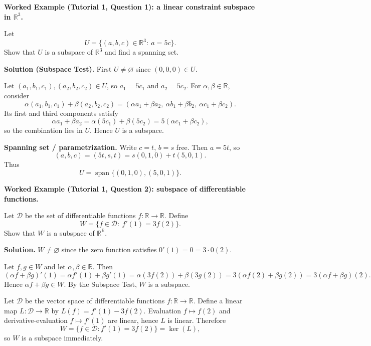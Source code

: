 \begin{examplebox}
\textbf{Worked Example (Tutorial 1, Question 1): a linear constraint subspace in $\mathbb{R}^3$.}

Let
\[
U=\{(a,b,c)\in\mathbb{R}^3:\ a=5c\}.
\]
Show that $U$ is a subspace of $\mathbb{R}^3$ and find a spanning set.

\medskip
\textbf{Solution (Subspace Test).}
First $U\neq\varnothing$ since $(0,0,0)\in U$.

Let $(a_1,b_1,c_1),(a_2,b_2,c_2)\in U$, so $a_1=5c_1$ and $a_2=5c_2$.
For $\alpha,\beta\in\mathbb{R}$, consider
\[
\alpha(a_1,b_1,c_1)+\beta(a_2,b_2,c_2)=(\alpha a_1+\beta a_2,\ \alpha b_1+\beta b_2,\ \alpha c_1+\beta c_2).
\]
Its first and third components satisfy
\[
\alpha a_1+\beta a_2=\alpha(5c_1)+\beta(5c_2)=5(\alpha c_1+\beta c_2),
\]
so the combination lies in $U$. Hence $U$ is a subspace.

\medskip
\textbf{Spanning set / parametrization.}
Write $c=t$, $b=s$ free. Then $a=5t$, so
\[
(a,b,c)=(5t,s,t)=s(0,1,0)+t(5,0,1).
\]
Thus
\[
U=\operatorname{span}\{(0,1,0),(5,0,1)\}.
\]
\end{examplebox}

\begin{examplebox}
\textbf{Worked Example (Tutorial 1, Question 2): subspace of differentiable functions.}

Let $\mathcal{D}$ be the set of differentiable functions $f:\mathbb{R}\to\mathbb{R}$.
Define
\[
W=\{f\in\mathcal{D}:\ f'(1)=3f(2)\}.
\]
Show that $W$ is a subspace of $\mathbb{R}^{\mathbb{R}}$.

\medskip
\textbf{Solution.}
$W\neq\varnothing$ since the zero function satisfies $0'(1)=0=3\cdot 0(2)$.

Let $f,g\in W$ and let $\alpha,\beta\in\mathbb{R}$.
Then
\[
(\alpha f+\beta g)'(1)=\alpha f'(1)+\beta g'(1)=\alpha(3f(2))+\beta(3g(2))=3(\alpha f(2)+\beta g(2))=3(\alpha f+\beta g)(2).
\]
Hence $\alpha f+\beta g\in W$. By the Subspace Test, $W$ is a subspace.
\end{examplebox}

\begin{policynote}[title={Extension (Tutorial 1, Question 2, Method 2)}]
Let $\mathcal{D}$ be the vector space of differentiable functions $f:\mathbb{R}\to\mathbb{R}$.
Define a linear map $L:\mathcal{D}\to\mathbb{R}$ by $L(f)=f'(1)-3f(2)$.
Evaluation $f\mapsto f(2)$ and derivative-evaluation $f\mapsto f'(1)$ are linear, hence $L$ is linear.
Therefore
\[
W=\{f\in\mathcal{D}: f'(1)=3f(2)\}=\ker(L),
\]
so $W$ is a subspace immediately.
\end{policynote}


